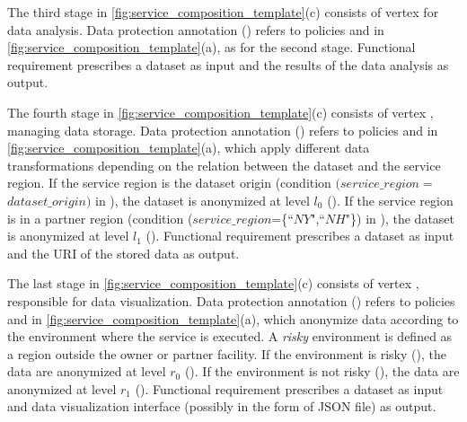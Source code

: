 \begin{example}[\bf \pipelineTemplate]
  The third stage in \cref{fig:service_composition_template}(c) consists of vertex   for data analysis.
  Data protection annotation \myLambda() refers to policies  and  in \cref{fig:service_composition_template}(a), as for the second stage.
  Functional requirement  prescribes a dataset as input and the results of the data analysis as output.

  The fourth stage in \cref{fig:service_composition_template}(c) consists of vertex , managing data storage. Data protection annotation \myLambda() refers to policies  and  in \cref{fig:service_composition_template}(a), which apply different data transformations depending on the relation between the dataset and the service region.
  If the service region is the dataset origin (condition $(service\_region$$=$$dataset\_origin)$ in ), the dataset is anonymized at level $l_0$ ().
  If the service region is in a partner region (condition ($service\_region$=\{``$NY$",``$NH$"\}) in ), the dataset is anonymized at level $l_1$ ().
  Functional requirement  prescribes a dataset as input and the URI of the stored data as output.

  The last stage in \cref{fig:service_composition_template}(c) consists of vertex , responsible for data visualization.
  Data protection annotation \myLambda() refers to policies  and  in \cref{fig:service_composition_template}(a), which anonymize data according to the environment where the service is executed.
  A \emph{risky} environment is defined as a region outside the owner or partner facility.
  If the environment is risky (), the data are anonymized at level $r_0$ ().
  If the environment is not risky (), the data are anonymized at level $r_1$ ().
  Functional requirement  prescribes a dataset as input and data visualization interface (possibly in the form of JSON file) as output.
\end{example}


